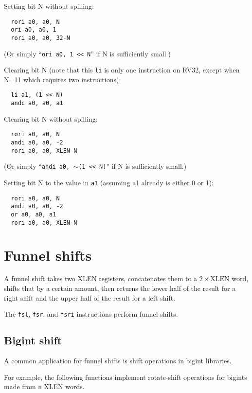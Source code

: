 Setting bit N without spilling:

\begin{verbatim}
  rori a0, a0, N
  ori a0, a0, 1
  rori a0, a0, 32-N
\end{verbatim}

(Or simply ``{\tt ori a0, 1 << N}'' if N is sufficiently small.)

Clearing bit N (note that this {\tt li} is only one instruction on RV32, except when N=11 which requires two instructions):

\begin{verbatim}
  li a1, (1 << N)
  andc a0, a0, a1
\end{verbatim}

Clearing bit N without spilling:

\begin{verbatim}
  rori a0, a0, N
  andi a0, a0, -2
  rori a0, a0, XLEN-N
\end{verbatim}

(Or simply ``{\tt andi a0, $\sim$(1 << N)}'' if N is sufficiently small.)

Setting bit N to the value in {\tt a1} (assuming a1 already is either 0 or 1):

\begin{verbatim}
  rori a0, a0, N
  andi a0, a0, -2
  or a0, a0, a1
  rori a0, a0, XLEN-N
\end{verbatim}


\section{Funnel shifts}
\label{funnel}

A funnel shift takes two XLEN registers, concatenates them to a $2 \times
\textrm{XLEN}$ word, shifts that by a certain amount, then returns the lower
half of the result for a right shift and the upper half of the result for a
left shift.

The {\tt fsl}, {\tt fsr}, and {\tt fsri} instructions perform funnel shifts.

\subsection{Bigint shift}

A common application for funnel shifts is shift operations in bigint libraries.

For example, the following functions implement rotate-shift operations
for bigints made from {\tt n} XLEN words.

